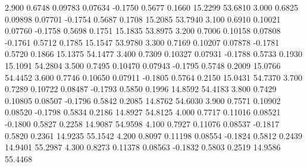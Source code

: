    2.900   0.6748   0.09783   0.07634  -0.1750   0.5677   0.1660  15.2299  53.6810
   3.000   0.6825   0.09898   0.07701  -0.1754   0.5687   0.1708  15.2085  53.7940
   3.100   0.6910   0.10021   0.07760  -0.1758   0.5698   0.1751  15.1835  53.8975
   3.200   0.7006   0.10158   0.07808  -0.1761   0.5712   0.1785  15.1547  53.9780
   3.300   0.7169   0.10207   0.07878  -0.1781   0.5720   0.1866  15.1375  54.1477
   3.400   0.7309   0.10327   0.07931  -0.1788   0.5733   0.1930  15.1091  54.2804
   3.500   0.7495   0.10470   0.07943  -0.1795   0.5748   0.2009  15.0766  54.4452
   3.600   0.7746   0.10650   0.07911  -0.1805   0.5764   0.2150  15.0431  54.7370
   3.700   0.7289   0.10722   0.08487  -0.1793   0.5850   0.1996  14.8592  54.4183
   3.800   0.7429   0.10805   0.08507  -0.1796   0.5842   0.2085  14.8762  54.6030
   3.900   0.7571   0.10902   0.08520  -0.1798   0.5834   0.2186  14.8927  54.8125
   4.000   0.7717   0.11016   0.08521  -0.1800   0.5827   0.2258  14.9087  54.9598
   4.100   0.7927   0.11076   0.08537  -0.1817   0.5820   0.2361  14.9235  55.1542
   4.200   0.8097   0.11198   0.08554  -0.1824   0.5812   0.2439  14.9401  55.2987
   4.300   0.8273   0.11378   0.08563  -0.1832   0.5803   0.2519  14.9586  55.4468
